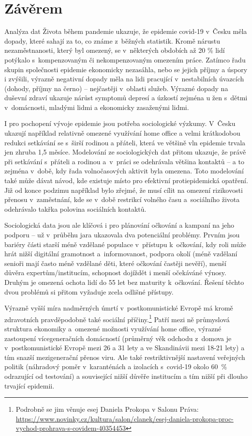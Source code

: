 \section*{Závěrem}

Analýza dat Života během pandemie ukazuje, že epidemie covid-19 v Česku měla dopady, které sahají za to, co známe z běžných statistik. Kromě nárustu nezaměstnanosti, který byl omezený, se v některých obdobích až 20 \% lidí potýkalo s kompenzovaným či nekompenzovaným omezením práce. Zatímco řadu skupin společnosti epidemie ekonomicky nezasáhla, nebo se jejich příjmy a úspory i zvýšili, výrazně negativní dopady měla na lidi pracující v nestabilních úvazcích (dohody, příjmy na černo) – nejčastěji v oblasti služeb. Výrazné dopady na duševní zdraví ukazuje nárůst symptomů depresí a úzkostí zejména u žen s dětmi v domácnosti, mladými lidmi a ekonomicky zasaženými lidmi.

I pro pochopení vývoje epidemie jsou potřeba sociologické výzkumy. V Česku ukazují například relativně omezené využívání home office a velmi krátkodobou redukci setkávání se s širší rodinou a přáteli, která ve většině vln epidemie trvala jen zhruba 1,5 měsíce. Modelování ze sociologických dat přitom ukazuje, že právě při setkávání s přáteli a rodinou a v práci se odehrávala většina kontaktů – a to zejména v době, kdy řada volnočasových aktivit byla omezena. Toto modelování také může dávat návod, kde existuje místo pro efektivní protiepidemická opatření. Již od konce podzimu například bylo zřejmé, že musí cílit na omezení rizikovosti přenosu v zaměstnání, kde se v době restrikcí volného času a sociálního života odehrávalo takřka polovina sociálních kontaktů.

Sociologická data jsou ale klíčová i pro plánování očkování a kampaní na jeho podporu – už v průběhu jara ukazovala dva potenciální problémy. Prvním jsou bariéry části starší méně vzdělané populace v přístupu k očkování, kdy roli může hrát nižší digitální gramotnost a informovanost, podpora okolí (méně vzdělaní senioři mají často méně vzdělané děti, které očkování častěji nevěří), menší důvěra expertům/institucím, schopnost dojíždět i menší očekáváné výnosy. Druhým je omezená ochota lidí do 55 let bez maturity k očkování. Řešení těchto dvou problémů si přitom vyžaduje zcela odlišné přístupy.

Výrazně vyšší míra nadměrných úmrtí v postkomunistické Evropě má kromě zdravotních pravděpodobně také sociální příčiny.\footnote{Podrobně se jim věnuje esej Daniela Prokopa v Salonu Práva: \url{https://www.novinky.cz/kultura/salon/clanek/esej-daniela-prokopa-proc-vychod-prohrava-s-covidem-40354453}} Patří mezi ně průmyslová struktura ekonomiky a omezené možnosti využívání home office, výrazné zastoupení vícegeneračních domácností (průměrný věk odchodu z domova je v postkomunistické Evropě mezi 26 a 31 lety a ve Skandinávii mezi 18-21 lety) a tím snazší mezigenerační přenos viru. Ale také restriktivnější nastavení veřejných politik (náhradový poměr v karanténách a izolacích s covid-19 okolo 60 \% odrazující od testování) a související nižší důvěře institucím a tím nižší při dlouho trvající epidemii.

